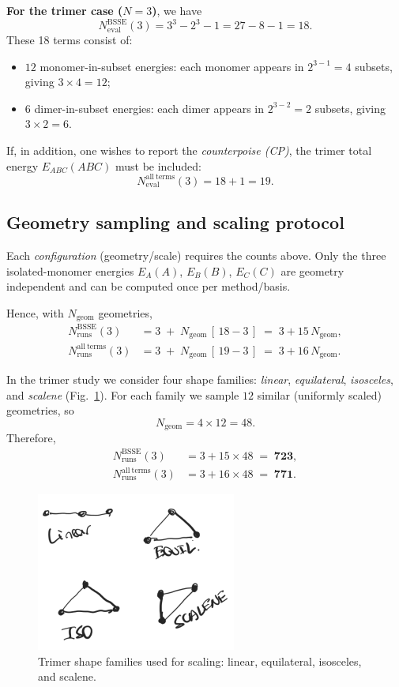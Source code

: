 \noindent\textbf{For the trimer case ($N=3$)}, we have
\[
N_{\mathrm{eval}}^{\mathrm{BSSE}}(3)
= 3^{3} - 2^{3} - 1
= 27 - 8 - 1
= \boxed{18}.
\]
These 18 terms consist of:
\begin{itemize}[leftmargin=2em,topsep=-0.25cm]
  \item $12$ monomer-in-subset energies: each monomer appears in $2^{3-1}=4$ subsets,
        giving $3\times 4 = 12$;
  \item $6$ dimer-in-subset energies: each dimer appears in $2^{3-2}=2$ subsets,
        giving $3\times 2 = 6$.
\end{itemize}
If, in addition, one wishes to report the \emph{counterpoise (CP)},
the trimer total energy $E_{ABC}(ABC)$ must be included:
\[
N_{\mathrm{eval}}^{\mathrm{all\ terms}}(3)
= 18 + 1 = \boxed{19}.
\]

\clearpage
\subsection{Geometry sampling and scaling protocol}
\label{sec:families}

Each \emph{configuration} (geometry/scale) requires the counts above. 
Only the three isolated-monomer energies $E_A(A)$, $E_B(B)$, $E_C(C)$ 
are geometry independent and can be computed once per method/basis.

Hence, with $N_{\mathrm{geom}}$ geometries,
\[
\boxed{
\begin{aligned}
N_{\mathrm{runs}}^{\mathrm{BSSE}}(3)
  &= 3 \;+\; N_{\mathrm{geom}}\,[\,18-3\,]
   \;=\; 3 + 15\,N_{\mathrm{geom}},\\[4pt]
N_{\mathrm{runs}}^{\mathrm{all\ terms}}(3)
  &= 3 \;+\; N_{\mathrm{geom}}\,[\,19-3\,]
   \;=\; 3 + 16\,N_{\mathrm{geom}}.
\end{aligned}}
\]

In the trimer study we consider four shape families:
\emph{linear}, \emph{equilateral}, \emph{isosceles}, and \emph{scalene}
(Fig.~\ref{fig:figure-1}). 
For each family we sample $12$ similar (uniformly scaled) geometries, so
\[
N_{\mathrm{geom}} = 4 \times 12 = 48.
\]
Therefore,
\[
\boxed{
\begin{aligned}
N_{\mathrm{runs}}^{\mathrm{BSSE}}(3) 
  &= 3 + 15\times 48 \;=\; \mathbf{723},\\[2pt]
N_{\mathrm{runs}}^{\mathrm{all\ terms}}(3) 
  &= 3 + 16\times 48 \;=\; \mathbf{771}.
\end{aligned}}
\]

\begin{figure}[!ht]
  \centering
  \includegraphics[width=0.28\linewidth]{images/trimers.png}
  \caption{Trimer shape families used for scaling: linear, equilateral, isosceles, and scalene.}
  \label{fig:figure-1}
\end{figure}

